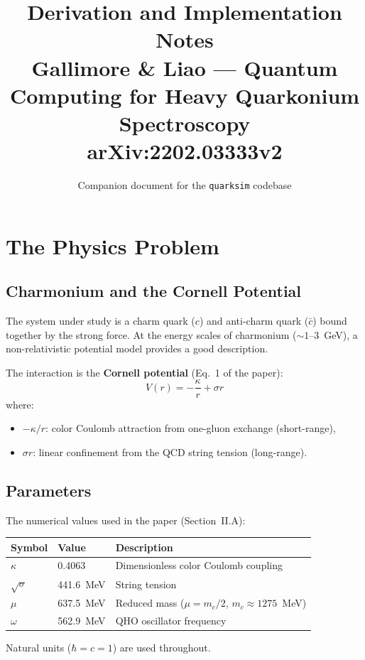 \documentclass[11pt,a4paper]{article}
\title{Derivation and Implementation Notes\\
\large Gallimore \& Liao --- Quantum Computing for Heavy Quarkonium Spectroscopy\\
\normalsize arXiv:2202.03333v2}
\author{Companion document for the \texttt{quarksim} codebase}
\date{}
\begin{document}
\maketitle

\tableofcontents
\newpage

\section{The Physics Problem}

\subsection{Charmonium and the Cornell Potential}

The system under study is a charm quark ($c$) and anti-charm quark ($\bar{c}$) bound together by the strong force. At the energy scales of charmonium ($\sim 1$--$3$~GeV), a non-relativistic potential model provides a good description.

The interaction is the \textbf{Cornell potential} (Eq.~1 of the paper):
\begin{equation}
  V(r) = -\frac{\kappa}{r} + \sigma r
  \label{eq:cornell}
\end{equation}
where:
\begin{itemize}[nosep]
  \item $-\kappa/r$: color Coulomb attraction from one-gluon exchange (short-range),
  \item $\sigma r$: linear confinement from the QCD string tension (long-range).
\end{itemize}

\subsection{Parameters}

The numerical values used in the paper (Section~II.A):
\begin{center}
\begin{tabular}{lll}
\toprule
Symbol & Value & Description \\
\midrule
$\kappa$ & 0.4063 & Dimensionless color Coulomb coupling \\
$\sqrt{\sigma}$ & 441.6~MeV & String tension \\
$\mu$ & 637.5~MeV & Reduced mass ($\mu = m_c/2$, $m_c \approx 1275$~MeV) \\
$\omega$ & 562.9~MeV & QHO oscillator frequency \\
\bottomrule
\end{tabular}
\end{center}
Natural units ($\hbar = c = 1$) are used throughout.
\end{document}
